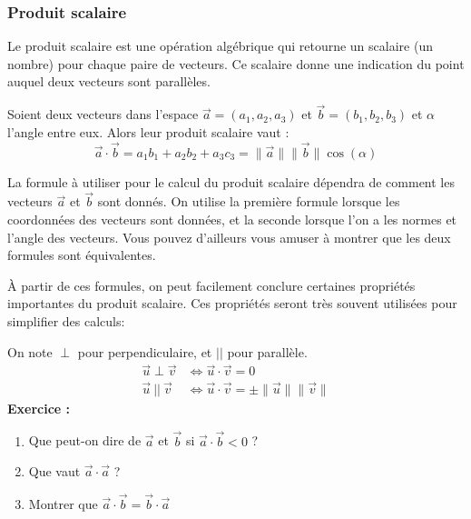 \documentclass{article}
\begin{document}
\subsubsection{Produit scalaire}
Le produit scalaire est une opération algébrique qui retourne un scalaire (un nombre) pour chaque paire de vecteurs. Ce scalaire donne une indication du point auquel deux vecteurs sont parallèles.

\begin{tcolorbox}[title=Calcul de produit scalaire, enlarge top by=1mm, enlarge bottom by=1mm]
 Soient deux vecteurs dans l'espace $\vec{a} = (a_1, a_2, a_3) $ et $\vec{b} = (b_1, b_2, b_3)$ et $\alpha$ l'angle entre eux. Alors leur produit scalaire vaut : \[ \vec{a} \cdot \vec{b} = a_1 b_1 + a_2 b_2 + a_3 c_3 = \lVert \vec{a} \rVert \lVert \vec{b} \rVert \cos(\alpha)\]
\end{tcolorbox}

La formule à utiliser pour le calcul du produit scalaire dépendra de comment les vecteurs $\vec{a}$ et $\vec{b}$ sont donnés. On utilise la première formule lorsque les coordonnées des vecteurs sont données, et la seconde lorsque l'on a les normes et l'angle des vecteurs. Vous pouvez d'ailleurs vous amuser à montrer que les deux formules sont équivalentes. 

À partir de ces formules, on peut facilement conclure certaines propriétés importantes du produit scalaire. Ces propriétés seront très souvent utilisées pour simplifier des calculs:

\begin{tcolorbox}[title = Propriétés du produit scalaire, enlarge top by=1mm, enlarge bottom by=1mm]
On note $\perp$ pour perpendiculaire, et $||$ pour parallèle.
\begin{align*}
    \vec{u} \perp \vec{v} &\iff \vec{u} \cdot \vec{v} = 0\\
\vec{u} \: || \: \vec{v} &\iff \vec{u} \cdot \vec{v} = \pm \lVert \vec{u} \rVert \lVert \vec{v} \rVert
\end{align*}
\textbf{Exercice :}

\begin{enumerate}
    \item Que peut-on dire de $\vec{a}$ et $\vec{b}$ si $\vec{a} \cdot \vec{b} < 0 $ ? 
    \item Que vaut $\vec{a} \cdot \vec{a}$ ?
    \item Montrer que $\vec{a} \cdot \vec{b} = \vec{b} \cdot \vec{a}$
\end{enumerate}
\end{tcolorbox}
\end{document}
